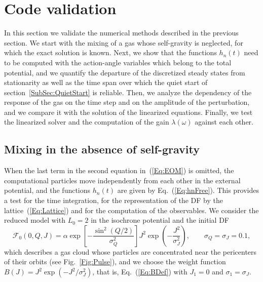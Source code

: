 \section{Code validation}
\label{Sec:Validation}

In this section we validate the numerical methods described in the previous section. We start with the mixing of a gas whose self-gravity is neglected, for which the exact solution is known. Next, we show that the functions $h_n(t)$ need to be computed with the action-angle variables which belong to the total potential, and we quantify the departure of the discretized steady states from stationarity as well as the time span over which the quiet start of section~\ref{SubSec:QuietStart} is reliable. Then, we analyze the dependency of the response of the gas on the time step and on the amplitude of the perturbation, and we compare it with the solution of the linearized equations. Finally, we test the linearized solver and the computation of the gain $\lambda(\omega)$ against each other.


\subsection{Mixing in the absence of self-gravity}
\label{SubSec:ValFree}

When the last term in the second equation in~(\ref{Eq:EOM}) is omitted, the computational particles move independently from each other in the external potential, and the functions $h_n(t)$ are given by Eq.~(\ref{Eq:hnFree}). This provides a test for the time integration, for the representation of the DF by the lattice~(\ref{Eq:Lattice}) and for the computation of the observables. We consider the reduced model with $L_0 = 2$ in the isochrone potential and the initial DF
\begin{equation}
\mathcal{F}_0(0,Q,J) = \alpha\exp\left[ -\frac{\sin^2(Q/2)}{\sigma_Q^2} \right] J^2\exp\left( -\frac{J^2}{\sigma_J^2} \right),\qquad
\sigma_Q = \sigma_J = 0.1,
\label{Eq:Pulse}
\end{equation}
which describes a gas cloud whose particles are concentrated near the pericenters of their orbits (see Fig.~\ref{Fig:Pulse}), and we choose the weight function $B(J) = J^2\exp(-J^2/\sigma_J^2)$, that is, Eq.~(\ref{Eq:BDef}) with $J_1 = 0$ and $\sigma_1 = \sigma_J$.

